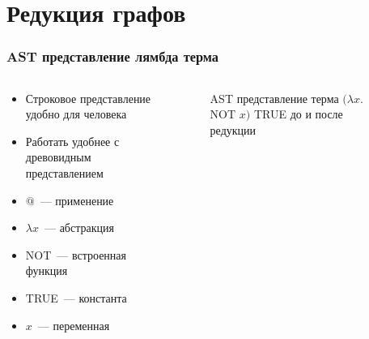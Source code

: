 \documentclass[aspectratio=169]{beamer}
\begin{document}
\section{Редукция графов}

\begin{frame}
    \frametitle{AST представление лямбда терма}
    \begin{columns}
        \begin{column}{0.5\textwidth}
            \begin{itemize}
                \item Строковое представление удобно для человека
                \item Работать удобнее с древовидным представлением
                \item $@$~--- применение
                \item $\lambda x$~--- абстракция
                \item NOT~--- встроенная функция
                \item TRUE~--- константа
                \item $x$~--- переменная
            \end{itemize}
        \end{column}
        \begin{column}{0.5\textwidth}
            \begin{figure}
                \caption{AST представление терма $(\lambda x.$ NOT $x)$ TRUE до и после редукции}
            \end{figure}
        \end{column}
    \end{columns}
\end{frame}
\end{document}
